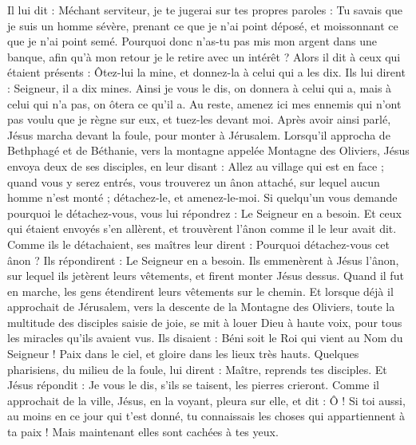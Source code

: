 \begin{multicols}{2}
Il lui dit : Méchant serviteur, je te jugerai sur tes propres paroles : Tu savais que je suis un homme sévère, prenant ce que je n'ai point déposé, et moissonnant ce que je n'ai point semé.
Pourquoi donc n'as-tu pas mis mon argent dans une banque, afin qu'à mon retour je le retire avec un intérêt ?
Alors il dit à ceux qui étaient présents : Ôtez-lui la mine, et donnez-la à celui qui a les dix.
Ils lui dirent : Seigneur, il a dix mines.
Ainsi je vous le dis, on donnera à celui qui a, mais à celui qui n'a pas, on ôtera ce qu'il a.
Au reste, amenez ici mes ennemis qui n'ont pas voulu que je règne sur eux, et tuez-les devant moi.
Après avoir ainsi parlé, Jésus marcha devant la foule, pour monter à Jérusalem.
Lorsqu'il approcha de Bethphagé et de Béthanie, vers la montagne appelée Montagne des Oliviers, Jésus envoya deux de ses disciples,
en leur disant : Allez au village qui est en face ; quand vous y serez entrés, vous trouverez un ânon attaché, sur lequel aucun homme n'est monté ; détachez-le, et amenez-le-moi.
Si quelqu'un vous demande pourquoi le détachez-vous, vous lui répondrez : Le Seigneur en a besoin.
Et ceux qui étaient envoyés s'en allèrent, et trouvèrent l'ânon comme il le leur avait dit.
Comme ils le détachaient, ses maîtres leur dirent : Pourquoi détachez-vous cet ânon ?
Ils répondirent : Le Seigneur en a besoin.
Ils emmenèrent à Jésus l'ânon, sur lequel ils jetèrent leurs vêtements, et firent monter Jésus dessus.
Quand il fut en marche, les gens étendirent leurs vêtements sur le chemin.
Et lorsque déjà il approchait de Jérusalem, vers la descente de la Montagne des Oliviers, toute la multitude des disciples saisie de joie, se mit à louer Dieu à haute voix, pour tous les miracles qu'ils avaient vus.
Ils disaient : Béni soit le Roi qui vient au Nom du Seigneur ! Paix dans le ciel, et gloire dans les lieux très hauts.
Quelques pharisiens, du milieu de la foule, lui dirent : Maître, reprends tes disciples.
Et Jésus répondit : Je vous le dis, s'ils se taisent, les pierres crieront.
Comme il approchait de la ville, Jésus, en la voyant, pleura sur elle, et dit :
Ô ! Si toi aussi, au moins en ce jour qui t'est donné, tu connaissais les choses qui appartiennent à ta paix ! Mais maintenant elles sont cachées à tes yeux.

\end{multicols}
